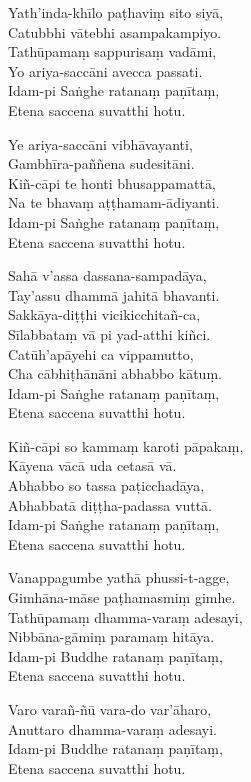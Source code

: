 \begin{paritta}
Yath'inda-khīlo paṭhaviṃ sito siyā,\\
Catubbhi vātebhi asampakampiyo.\\
Tathūpamaṃ sappurisaṃ vadāmi,\\
Yo ariya-saccāni avecca passati.\\
Idam-pi Saṅghe ratanaṃ paṇītaṃ,\\
Etena saccena suvatthi hotu.

Ye ariya-saccāni vibhāvayanti,\\
Gambhīra-paññena sudesitāni.\\
Kiñ-cāpi te honti bhusappamattā,\\
Na te bhavaṃ aṭṭhamam-ādiyanti.\\
Idam-pi Saṅghe ratanaṃ paṇītaṃ,\\
Etena saccena suvatthi hotu.

Sahā v'assa dassana-sampadāya,\\
Tay'assu dhammā jahitā bhavanti.\\
Sakkāya-diṭṭhi vicikicchitañ-ca,\\
Sīlabbataṃ vā pi yad-atthi kiñci.\\
Catūh'apāyehi ca vippamutto,\\
Cha cābhiṭhānāni abhabbo kātuṃ.\\
Idam-pi Saṅghe ratanaṃ paṇītaṃ,\\
Etena saccena suvatthi hotu.

Kiñ-cāpi so kammaṃ karoti pāpakaṃ,\\
Kāyena vācā uda cetasā vā.\\
Abhabbo so tassa paṭicchadāya,\\
Abhabbatā diṭṭha-padassa vuttā.\\
Idam-pi Saṅghe ratanaṃ paṇītaṃ,\\
Etena saccena suvatthi hotu.

Vanappagumbe yathā phussi-t-agge,\\
Gimhāna-māse paṭhamasmiṃ gimhe.\\
Tathūpamaṃ dhamma-varaṃ adesayi,\\
Nibbāna-gāmiṃ paramaṃ hitāya.\\
Idam-pi Buddhe ratanaṃ paṇītaṃ,\\
Etena saccena suvatthi hotu.

Varo varañ-ñū vara-do var'āharo,\\
Anuttaro dhamma-varaṃ adesayi.\\
Idam-pi Buddhe ratanaṃ paṇītaṃ,\\
Etena saccena suvatthi hotu.


\end{paritta}
